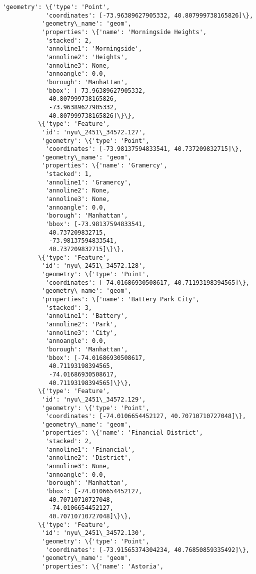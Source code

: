 \documentclass[11pt]{article}
\begin{document}
\begin{Verbatim}[commandchars=\\\{\}]
           'geometry': \{'type': 'Point',
            'coordinates': [-73.96389627905332, 40.807999738165826]\},
           'geometry\_name': 'geom',
           'properties': \{'name': 'Morningside Heights',
            'stacked': 2,
            'annoline1': 'Morningside',
            'annoline2': 'Heights',
            'annoline3': None,
            'annoangle': 0.0,
            'borough': 'Manhattan',
            'bbox': [-73.96389627905332,
             40.807999738165826,
             -73.96389627905332,
             40.807999738165826]\}\},
          \{'type': 'Feature',
           'id': 'nyu\_2451\_34572.127',
           'geometry': \{'type': 'Point',
            'coordinates': [-73.98137594833541, 40.737209832715]\},
           'geometry\_name': 'geom',
           'properties': \{'name': 'Gramercy',
            'stacked': 1,
            'annoline1': 'Gramercy',
            'annoline2': None,
            'annoline3': None,
            'annoangle': 0.0,
            'borough': 'Manhattan',
            'bbox': [-73.98137594833541,
             40.737209832715,
             -73.98137594833541,
             40.737209832715]\}\},
          \{'type': 'Feature',
           'id': 'nyu\_2451\_34572.128',
           'geometry': \{'type': 'Point',
            'coordinates': [-74.01686930508617, 40.71193198394565]\},
           'geometry\_name': 'geom',
           'properties': \{'name': 'Battery Park City',
            'stacked': 3,
            'annoline1': 'Battery',
            'annoline2': 'Park',
            'annoline3': 'City',
            'annoangle': 0.0,
            'borough': 'Manhattan',
            'bbox': [-74.01686930508617,
             40.71193198394565,
             -74.01686930508617,
             40.71193198394565]\}\},
          \{'type': 'Feature',
           'id': 'nyu\_2451\_34572.129',
           'geometry': \{'type': 'Point',
            'coordinates': [-74.0106654452127, 40.70710710727048]\},
           'geometry\_name': 'geom',
           'properties': \{'name': 'Financial District',
            'stacked': 2,
            'annoline1': 'Financial',
            'annoline2': 'District',
            'annoline3': None,
            'annoangle': 0.0,
            'borough': 'Manhattan',
            'bbox': [-74.0106654452127,
             40.70710710727048,
             -74.0106654452127,
             40.70710710727048]\}\},
          \{'type': 'Feature',
           'id': 'nyu\_2451\_34572.130',
           'geometry': \{'type': 'Point',
            'coordinates': [-73.91565374304234, 40.76850859335492]\},
           'geometry\_name': 'geom',
           'properties': \{'name': 'Astoria',

\end{Verbatim}
\end{document}

